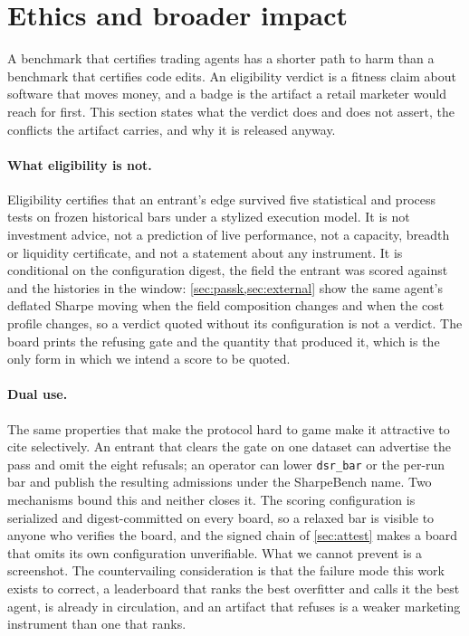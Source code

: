 \section{Ethics and broader impact}\label{sec:ethics}

A benchmark that certifies trading agents has a shorter path to harm than a benchmark that certifies code edits. An eligibility verdict is a fitness claim about software that moves money, and a badge is the artifact a retail marketer would reach for first. This section states what the verdict does and does not assert, the conflicts the artifact carries, and why it is released anyway.

\paragraph{What eligibility is not.} Eligibility certifies that an entrant's edge survived five statistical and process tests on frozen historical bars under a stylized execution model. It is not investment advice, not a prediction of live performance, not a capacity, breadth or liquidity certificate, and not a statement about any instrument. It is conditional on the configuration digest, the field the entrant was scored against and the histories in the window: \cref{sec:passk,sec:external} show the same agent's deflated Sharpe moving when the field composition changes and when the cost profile changes, so a verdict quoted without its configuration is not a verdict. The board prints the refusing gate and the quantity that produced it, which is the only form in which we intend a score to be quoted.

\paragraph{Dual use.} The same properties that make the protocol hard to game make it attractive to cite selectively. An entrant that clears the gate on one dataset can advertise the pass and omit the eight refusals; an operator can lower \texttt{dsr\_bar} or the per-run bar and publish the resulting admissions under the SharpeBench name. Two mechanisms bound this and neither closes it. The scoring configuration is serialized and digest-committed on every board, so a relaxed bar is visible to anyone who verifies the board, and the signed chain of \cref{sec:attest} makes a board that omits its own configuration unverifiable. What we cannot prevent is a screenshot. The countervailing consideration is that the failure mode this work exists to correct, a leaderboard that ranks the best overfitter and calls it the best agent, is already in circulation, and an artifact that refuses is a weaker marketing instrument than one that ranks.

